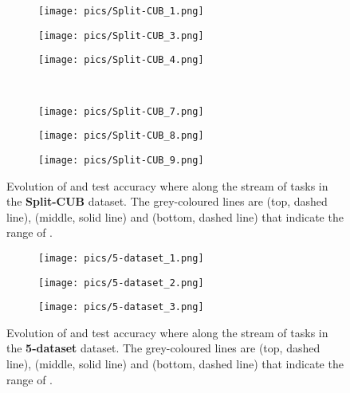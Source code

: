 \documentclass{article} \usepackage{collas2022_conference,times}
\begin{document}
    \begin{figure*}[t!]
        \centering
        \begin{subfigure}[b]{0.32\textwidth}
            \texttt{[image: pics/Split-CUB\_1.png]}\caption{}
        \end{subfigure}
        \hfill
        \begin{subfigure}[b]{0.32\textwidth}
            \texttt{[image: pics/Split-CUB\_3.png]}\caption{}
        \end{subfigure}
        \hfill
        \begin{subfigure}[b]{0.32\textwidth}
            \texttt{[image: pics/Split-CUB\_4.png]}\caption{}
        \end{subfigure}
        \\
        \begin{subfigure}[b]{0.32\textwidth}
            \texttt{[image: pics/Split-CUB\_7.png]}\caption{}
        \end{subfigure}
        \hfill
        \begin{subfigure}[b]{0.32\textwidth}
            \texttt{[image: pics/Split-CUB\_8.png]}\caption{}
        \end{subfigure}
        \hfill
        \begin{subfigure}[b]{0.32\textwidth}
            \texttt{[image: pics/Split-CUB\_9.png]}\caption{}
        \end{subfigure}
        \caption{Evolution of  and test accuracy  where  along the stream of  tasks in the \textbf{Split-CUB} dataset. The grey-coloured lines are   (top, dashed line),   (middle, solid line) and   (bottom, dashed line) that indicate the range of .}
        \label{alpha_cub_app}
    \end{figure*}
    \begin{figure*}[t!]
        \centering
        \begin{subfigure}[b]{0.32\textwidth}
            \texttt{[image: pics/5-dataset\_1.png]}\caption{}
        \end{subfigure}
        \hfill
        \begin{subfigure}[b]{0.32\textwidth}
            \texttt{[image: pics/5-dataset\_2.png]}\caption{}
        \end{subfigure}
        \hfill
        \begin{subfigure}[b]{0.32\textwidth}
            \texttt{[image: pics/5-dataset\_3.png]}\caption{}
        \end{subfigure}
        \caption{Evolution of  and test accuracy  where  along the stream of  tasks in the \textbf{5-dataset} dataset. The grey-coloured lines are   (top, dashed line),   (middle, solid line) and   (bottom, dashed line) that indicate the range of .}
        \label{alpha_5data_app}
    \end{figure*}
    
\end{document}
